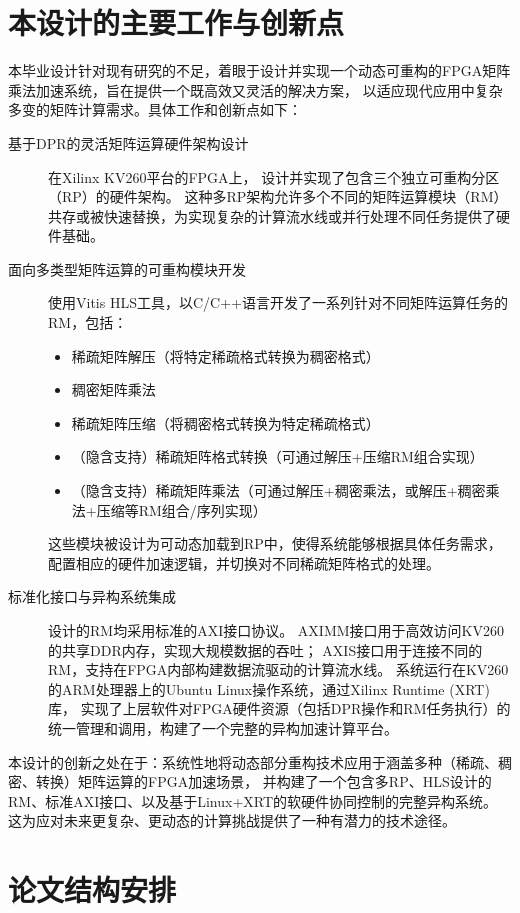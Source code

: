 \section{本设计的主要工作与创新点}

本毕业设计针对现有研究的不足，着眼于设计并实现一个动态可重构的FPGA矩阵乘法加速系统，旨在提供一个既高效又灵活的解决方案，
以适应现代应用中复杂多变的矩阵计算需求。具体工作和创新点如下：
\begin{description}
\item[基于DPR的灵活矩阵运算硬件架构设计] 在Xilinx KV260平台的FPGA上，
  设计并实现了包含三个独立可重构分区（RP）的硬件架构。
  这种多RP架构允许多个不同的矩阵运算模块（RM）共存或被快速替换，为实现复杂的计算流水线或并行处理不同任务提供了硬件基础。
\item[面向多类型矩阵运算的可重构模块开发] 使用Vitis HLS工具，以C/C++语言开发了一系列针对不同矩阵运算任务的RM，包括：
\begin{itemize}
  \item 稀疏矩阵解压（将特定稀疏格式转换为稠密格式）
  \item 稠密矩阵乘法
  \item 稀疏矩阵压缩（将稠密格式转换为特定稀疏格式）
  \item （隐含支持）稀疏矩阵格式转换（可通过解压+压缩RM组合实现）
  \item （隐含支持）稀疏矩阵乘法（可通过解压+稠密乘法，或解压+稠密乘法+压缩等RM组合/序列实现）
\end{itemize}
这些模块被设计为可动态加载到RP中，使得系统能够根据具体任务需求，配置相应的硬件加速逻辑，并切换对不同稀疏矩阵格式的处理。
\item[标准化接口与异构系统集成] 设计的RM均采用标准的AXI接口协议。
AXIMM接口用于高效访问KV260的共享DDR内存，实现大规模数据的吞吐；
AXIS接口用于连接不同的RM，支持在FPGA内部构建数据流驱动的计算流水线。
系统运行在KV260的ARM处理器上的Ubuntu Linux操作系统，通过Xilinx Runtime (XRT)库，
实现了上层软件对FPGA硬件资源（包括DPR操作和RM任务执行）的统一管理和调用，构建了一个完整的异构加速计算平台。
\end{description}

本设计的创新之处在于：系统性地将动态部分重构技术应用于涵盖多种（稀疏、稠密、转换）矩阵运算的FPGA加速场景，
并构建了一个包含多RP、HLS设计的RM、标准AXI接口、以及基于Linux+XRT的软硬件协同控制的完整异构系统。
这为应对未来更复杂、更动态的计算挑战提供了一种有潜力的技术途径。

\section{论文结构安排}

